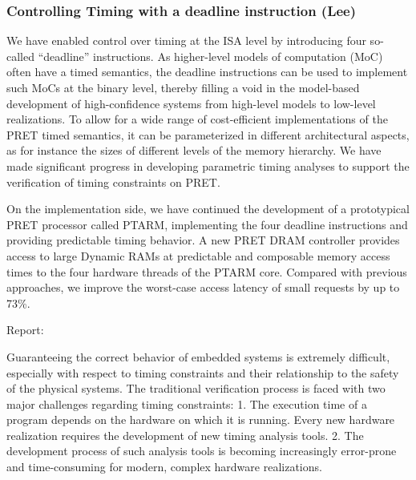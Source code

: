 \subsubsection{Controlling Timing with a deadline instruction (Lee)}

	      
	      We have enabled control over timing at the ISA level by
               introducing four so-called ``deadline''
               instructions. As higher-level models of computation
               (MoC) often have a timed semantics, the deadline
               instructions can be used to implement such MoCs at the
               binary level, thereby filling a void in the model-based
               development of high-confidence systems from high-level
               models to low-level realizations. To allow for a wide
               range of cost-efficient implementations of the PRET
               timed semantics, it can be parameterized in different
               architectural aspects, as for instance the sizes of
               different levels of the memory hierarchy. We have made
               significant progress in developing parametric timing
               analyses to support the verification of timing
               constraints on PRET.

               On the implementation side, we have continued the
               development of a prototypical PRET processor called
               PTARM, implementing the four deadline instructions and
               providing predictable timing behavior. A new PRET DRAM
               controller provides access to large Dynamic RAMs at
               predictable and composable memory access times to the
               four hardware threads of the PTARM core. Compared with
               previous approaches, we improve the worst-case access
               latency of small requests by up to 73\%.
               
               Report:
               
               Guaranteeing the correct behavior of embedded systems
               is extremely difficult, especially with respect to
               timing constraints and their relationship to the safety
               of the physical systems. The traditional verification
               process is faced with two major challenges regarding
               timing constraints: 1. The execution time of a program
               depends on the hardware on which it is running. Every
               new hardware realization requires the development of
               new timing analysis tools. 2. The development process
               of such analysis tools is becoming increasingly
               error-prone and time-consuming for modern, complex
               hardware realizations.

